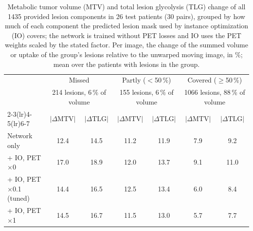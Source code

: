 \begin{table}[t]
\centering
\caption{Metabolic tumor volume (MTV) and total lesion glycolysis (TLG) change of all 1435 provided lesion components in 26 test patients (30 pairs), grouped by how much of each component the predicted lesion mask used by instance optimization (IO) covers; the network is trained without PET losses and IO uses the PET weights scaled by the stated factor.
 Per image, the change of the summed volume or uptake of the group's lesions relative to the unwarped moving image, in \%; mean over the patients with lesions in the group.}
\label{tab:detection_groups}
\scriptsize
\setlength{\tabcolsep}{3pt}
\begin{tabular}{lcccccc}
\toprule
 & \multicolumn{2}{c}{Missed} & \multicolumn{2}{c}{Partly ($<$50\,\%)} & \multicolumn{2}{c}{Covered ($\geq$50\,\%)} \\
 & \multicolumn{2}{c}{\tiny 214 lesions, 6\,\% of volume} & \multicolumn{2}{c}{\tiny 155 lesions, 6\,\% of volume} & \multicolumn{2}{c}{\tiny 1066 lesions, 88\,\% of volume} \\
\cmidrule(lr){2-3}\cmidrule(lr){4-5}\cmidrule(lr){6-7}
 & $|\Delta\mathrm{MTV}|$ & $|\Delta\mathrm{TLG}|$ & $|\Delta\mathrm{MTV}|$ & $|\Delta\mathrm{TLG}|$ & $|\Delta\mathrm{MTV}|$ & $|\Delta\mathrm{TLG}|$ \\
\midrule
Network only & 12.4 & 14.5 & 11.2 & 11.9 & 7.9 & 9.2 \\
\midrule
+ IO, PET $\times$0 & 17.0 & 18.9 & 12.0 & 13.7 & 9.1 & 11.0 \\
+ IO, PET $\times$0.1 (tuned) & 14.4 & 16.5 & 12.5 & 13.4 & 6.0 & 8.4 \\
+ IO, PET $\times$1 & 14.5 & 16.7 & 11.5 & 13.0 & 5.7 & 7.7 \\
\bottomrule
\end{tabular}
\end{table}
